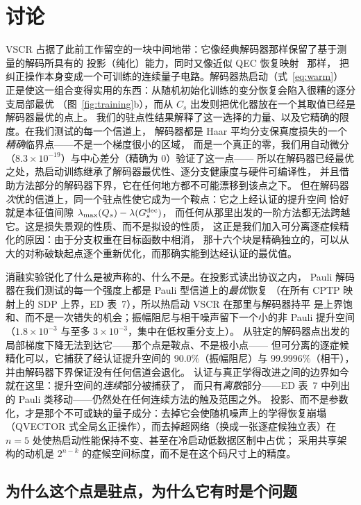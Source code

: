 \documentclass[11pt,a4paper]{article}
\begin{document}
\section*{讨论}

VSCR 占据了此前工作留空的一块中间地带：它像经典解码器那样保留了基于测量的解码所具有的
投影（纯化）能力，同时又像近似 QEC 恢复映射~\cite{petz_map,beny_optimal} 那样，
把纠正操作本身变成一个可训练的连续量子电路。解码器热启动（式~\ref{eq:warm}）
正是使这一组合变得实用的东西：从随机初始化训练的变分恢复会陷入很糟的逐分支局部最优
（图~\ref{fig:training}b），而从 $C_s$ 出发则把优化器放在一个其取值已经是解码器最优的点上。
我们的驻点性结果解释了这一选择的力量、以及它精确的限度。在我们测试的每一个信道上，
解码器都是 Haar 平均分支保真度损失的一个\emph{精确}临界点——不是一个梯度很小的区域，
而是一个真正的零，我们用自动微分（$8.3\times10^{-19}$）与中心差分（精确为 $0$）验证了这一点——
所以在解码器已经最优之处，热启动训练继承了解码器最优性、逐分支健康度与硬件可编译性，
并且借助方法部分的解码器下界，它在任何地方都不可能漂移到该点之下。
但在解码器\emph{次}优的信道上，同一个驻点性使它成为一个鞍点：它之上经认证的提升空间
恰好就是本征值间隙 $\lambda_{\max}(Q_s)-\lambda(G^{\rm dec}_s)$，
而任何从那里出发的一阶方法都无法跨越它。这是损失景观的性质、而不是拟设的性质，
这正是我们加入可分离逐症候精化的原因：由于分支权重在目标函数中相消，
那十六个块是精确独立的，可以从大的对称破缺起点逐个重新优化，而那确实能到达经认证的最优值。

消融实验锐化了什么是被声称的、什么不是。在投影式读出协议之内，
Pauli 解码器在我们测试的每一个强度上都是 Pauli 型信道上的\emph{最优}恢复
（在所有 CPTP 映射上的 SDP 上界，ED 表~7），所以热启动 VSCR 在那里与解码器持平
是上界饱和、而不是一次错失的机会；振幅阻尼与相干噪声留下一个小的非 Pauli 提升空间
（$1.8\times10^{-3}$ 与至多 $3\times10^{-3}$，集中在低权重分支上）。
从驻定的解码器点出发的局部梯度下降无法到达它——那个点是鞍点、不是极小点——
但可分离的逐症候精化可以，它捕获了经认证提升空间的 $90.0\%$（振幅阻尼）与
$99.9996\%$（相干），并由解码器下界保证没有任何信道会退化。
认证与真正学得改进之间的边界如今就在这里：提升空间的\emph{连续}部分被捕获了，
而只有\emph{离散}部分——ED 表~7 中列出的 Pauli 类移动——仍然处在任何连续方法的触及范围之外。
投影、而不是参数化，才是那个不可或缺的量子成分：去掉它会使随机噪声上的学得恢复崩塌
（QVECTOR 式全局幺正操作），而去掉超网络（换成一张逐症候独立表）在 $n=5$
处使热启动性能保持不变、甚至在冷启动低数据区制中占优；
采用共享架构的动机是 $2^{n-k}$ 的症候空间标度，而不是在这个码尺寸上的精度。

\subsection*{为什么这个点是驻点，为什么它有时是个问题}
\end{document}
